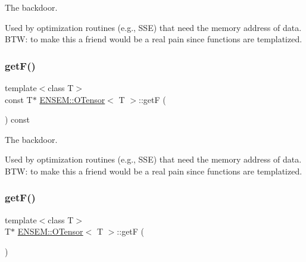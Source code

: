 The backdoor. 

Used by optimization routines (e.\+g., S\+SE) that need the memory address of data. B\+TW\+: to make this a friend would be a real pain since functions are templatized. \mbox{\label{classENSEM_1_1OTensor_ac9462508146fa6ceba2797c9994ea54c}} 
\subsubsection{\texorpdfstring{getF()}{getF()}\hspace{0.1cm}{\footnotesize\ttfamily [2/4]}}
{\footnotesize\ttfamily template$<$class T$>$ \\
const T$\ast$ \mbox{\hyperlink{classENSEM_1_1OTensor}{E\+N\+S\+E\+M\+::\+O\+Tensor}}$<$ T $>$\+::getF (\begin{DoxyParamCaption}{ }\end{DoxyParamCaption}) const\hspace{0.3cm}{\ttfamily [inline]}}



The backdoor. 

Used by optimization routines (e.\+g., S\+SE) that need the memory address of data. B\+TW\+: to make this a friend would be a real pain since functions are templatized. \mbox{\label{classENSEM_1_1OTensor_acaf63577c9d67fe58f649ae9fac008c1}} 
\subsubsection{\texorpdfstring{getF()}{getF()}\hspace{0.1cm}{\footnotesize\ttfamily [3/4]}}
{\footnotesize\ttfamily template$<$class T$>$ \\
T$\ast$ \mbox{\hyperlink{classENSEM_1_1OTensor}{E\+N\+S\+E\+M\+::\+O\+Tensor}}$<$ T $>$\+::getF (\begin{DoxyParamCaption}{ }\end{DoxyParamCaption})\hspace{0.3cm}{\ttfamily [inline]}}

\mbox{\label{classENSEM_1_1OTensor_acaf63577c9d67fe58f649ae9fac008c1}} 
